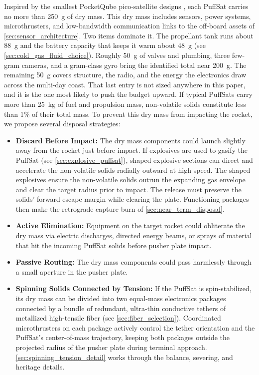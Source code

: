 \documentclass{article}
\begin{document}
Inspired by the smallest PocketQube pico-satellite designs \cite{pocketqube_mass_reference}, each PuffSat carries no more than \SI{250}{\gram} of dry mass. This dry mass includes sensors, power systems, microthrusters, and low-bandwidth communication links to the off-board assets of \autoref{sec:sensor_architecture}. Two items dominate it. The propellant tank runs about \SI{88}{\gram} and the battery capacity that keeps it warm about \SI{48}{\gram} (see \autoref{sec:cold_gas_fluid_choice}). Roughly \SI{50}{\gram} of valves and plumbing, three few-gram cameras, and a gram-class gyro bring the identified total near \SI{200}{\gram}. The remaining \SI{50}{\gram} covers structure, the radio, and the energy the electronics draw across the multi-day coast. That last entry is not sized anywhere in this paper, and it is the one most likely to push the budget upward. If typical PuffSats carry more than \SI{25}{\kilo\gram} of fuel and propulsion mass, non-volatile solids constitute less than 1\% of their total mass. To prevent this dry mass from impacting the rocket, we propose several disposal strategies:

\begin{itemize}
    \item \textbf{Discard Before Impact:} The dry mass components could launch slightly away from the rocket just before impact. If explosives are used to gasify the PuffSat (see \autoref{sec:explosive_puffsat}), shaped explosive sections can direct and accelerate the non-volatile solids radially outward at high speed. The shaped explosives ensure the non-volatile solids outrun the expanding gas envelope and clear the target radius prior to impact. The release must preserve the solids' forward escape margin while clearing the plate. Functioning packages then make the retrograde capture burn of \autoref{sec:near_term_disposal}. \label{item:discard_before_impact}
    \item \textbf{Active Elimination:} Equipment on the target rocket could obliterate the dry mass via electric discharges, directed energy beams, or sprays of material that hit the incoming PuffSat solids before pusher plate impact.
    \item \textbf{Passive Routing:} The dry mass components could pass harmlessly through a small aperture in the pusher plate.
    \item \textbf{Spinning Solids Connected by Tension:} If the PuffSat is spin-stabilized, its dry mass can be divided into two equal-mass electronics packages connected by a bundle of redundant, ultra-thin conductive tethers of metallized high-tensile fiber (see \autoref{sec:fiber_selection}). Coordinated microthrusters on each package actively control the tether orientation and the PuffSat's center-of-mass trajectory, keeping both packages outside the projected radius of the pusher plate during terminal approach. \autoref{sec:spinning_tension_detail} works through the balance, severing, and heritage details. \label{item:spinning_solids_tension}
\end{itemize}
\end{document}
